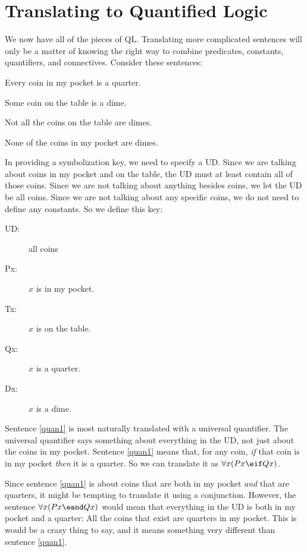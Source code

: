 \section{Translating to Quantified Logic}
We now have all of the pieces of QL. Translating more complicated sentences will only be a matter of knowing the right way to combine predicates, constants, quantifiers, and connectives. Consider these sentences:
\begin{kormanize}
\item[\ex{quan1}] Every coin in my pocket is a quarter.
\item[\ex{quan2}] Some coin on the table is a dime.
\item[\ex{quan3}] Not all the coins on the table are dimes.
\item[\ex{quan4}] None of the coins in my pocket are dimes.
\end{kormanize}
In providing a symbolization key, we need to specify a UD. Since we are talking about coins in my pocket and on the table, the UD must at least contain all of those coins. Since we are not talking about anything besides coins, we let the UD be all coins. Since we are not talking about any specific coins, we do not need to define any constants. So we define this key:
\begin{description}
\item[UD:] all coins
\item[Px:] $x$ is in my pocket.
\item[Tx:] $x$ is on the table.
\item[Qx:] $x$ is a quarter.
\item[Dx:] $x$ is a dime.
\end{description}
Sentence \ref{quan1} is most naturally translated with a universal quantifier. The universal quantifier says something about everything in the UD, not just about the coins in my pocket. Sentence \ref{quan1} means that, for any coin, \emph{if} that coin is in my pocket \emph{then} it is a quarter. So we can translate it as $\forall x(Px \eif Qx)$.

Since sentence \ref{quan1} is about coins that are both in my pocket \emph{and} that are quarters, it might be tempting to translate it using a conjunction. However, the sentence $\forall x(Px \eand Qx)$ would mean that everything in the UD is both in my pocket and a quarter: All the coins that exist are quarters in my pocket. This is would be a crazy thing to say, and it means something very different than sentence \ref{quan1}.

